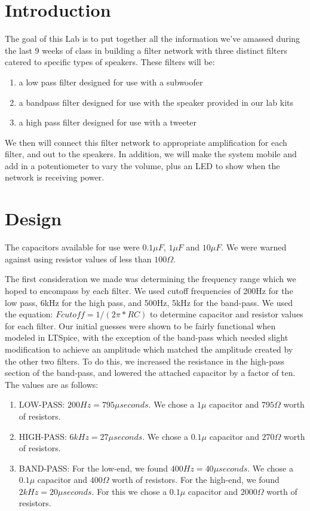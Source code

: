 \documentclass{article}
\title{Chapter #6 Lab Writeup}
\author{Zach Thompson, Simon Hannes, Kyle Peterson}
\begin{document}
\maketitle{}

\section*{Introduction}
The goal of this Lab is to put together all the information we've amassed 
during the last 9 weeks of class in building a filter network with three
distinct filters catered to specific types of speakers. These filters will
be:
\begin{enumerate}
\item a low pass filter designed for use with a subwoofer
\item a bandpass filter designed for use with the speaker provided in our lab kits
\item a high pass filter designed for use with a tweeter
\end{enumerate}

We then will connect this filter network to appropriate amplification for each 
filter, and out to the speakers. In addition, we will make the system mobile
 and add in a potentiometer to vary the volume, plus an LED to show when the 
network is receiving power.

\section*{Design}
The capacitors available for use were $0.1\mu F$, $1\mu F$ and $10\mu F$. We 
were warned against using resistor values of less than $100\Omega$.

The first consideration we made was determining the frequency range which 
we hoped to encompass by each filter. We used cutoff frequencies of 200Hz
for the low pass, 6kHz for the high pass, and 500Hz, 5kHz for the band-pass.
We used the equation: $Fcutoff = 1/(2\pi*RC)$ to determine capacitor and 
resistor values for each filter. Our initial guesses were shown to be fairly 
functional when modeled in LTSpice, with the exception of the band-pass which 
needed slight modification to achieve an amplitude which matched the amplitude 
created by the other two  filters. To do this, we increased the resistance
in the high-pass section of  the band-pass, and lowered the attached capacitor
by a factor of ten. The values are as follows:
\begin{enumerate}
\item LOW-PASS: $200Hz=795\mu seconds$. We chose a $1\mu$ capacitor and 
$795\Omega$ worth of resistors.
\item HIGH-PASS: $6kHz=27\mu seconds$. We chose a $0.1\mu$ capacitor and 
$270\Omega$ worth of resistors. 
\item BAND-PASS: For the low-end, we found $400Hz=40\mu seconds$. We chose a $0.1\mu$ capacitor and $400\Omega$ worth of resistors. For the high-end, we found
$2kHz=20\mu seconds$. For this we chose a $0.1\mu$ capacitor and $2000\Omega$
worth of resistors.
\end{enumerate}
\end{document}
